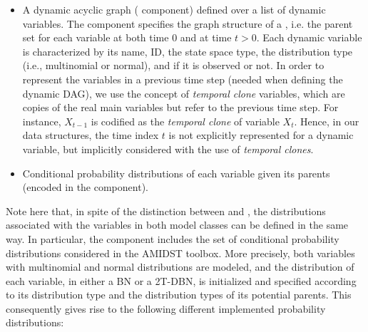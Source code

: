 \begin{itemize}
\item A dynamic acyclic graph ( component) defined over a list of dynamic variables. The
  component specifies the graph structure of a , i.e. the parent set for each variable at both time $0$ and at time $t>0$. Each dynamic variable is characterized by its name, ID, the state space type, the distribution type (i.e., multinomial or normal), and if it is observed or not. In order to represent the variables in a previous time step (needed when defining the dynamic DAG), we use the concept of \textit{temporal clone} variables, which are copies of the real main variables but refer to the previous time step. For instance, $X_{t-1}$ is codified as the \textit{temporal clone} of variable $X_t$. Hence, in our data structures, the time index $t$ is not explicitly represented for a dynamic variable, but implicitly considered with the use of \textit{temporal clones}.

\item Conditional probability distributions of each variable given its parents (encoded in the  component).

\end{itemize}

Note here that, in spite of the distinction between  and , the distributions associated
with the variables in both model classes can be defined in the same way. In particular, the  component
includes the set of conditional probability distributions considered in the AMIDST toolbox. More precisely,
both variables with multinomial and normal distributions are modeled, and the distribution of each variable,
in either a BN or a 2T-DBN, is initialized and specified according to its distribution type and the
distribution types of its potential parents. This consequently gives rise to the following different
implemented probability distributions: 


